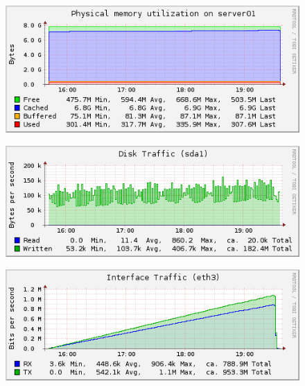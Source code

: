 \documentclass[Measurement results]{subfiles}
\begin{document}
\begin{figure}[H]
\centering
\includegraphics[scale=0.7]{images/results/baseline_wp/memory.png}
\end{figure}

\begin{figure}[H]
\centering
\includegraphics[scale=0.7]{images/results/baseline_wp/disk.png}
\end{figure}

\begin{figure}[H]
\centering
\includegraphics[scale=0.7]{images/results/baseline_wp/interface.png}
\end{figure}

\newpage
\end{document}
